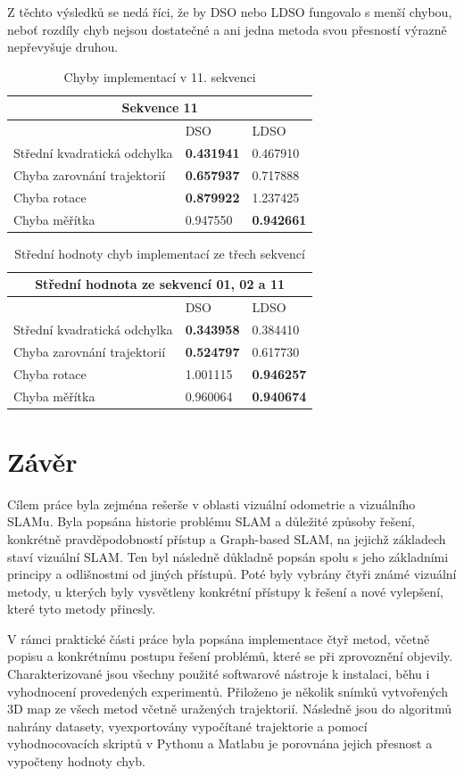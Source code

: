 \documentclass[12pt,a4paper]{article}
\begin{document}
Z těchto výsledků se nedá říci, že by DSO nebo LDSO fungovalo s menší chybou, neboť rozdíly chyb nejsou dostatečné a ani jedna metoda svou přesností výrazně nepřevyšuje druhou.
\begin{table}[H]
\centering
\begin{tabular}{|l|l|l|}
\hline
\multicolumn{3}{|c|}{\textbf{Sekvence 11}} \\
\hline
 & DSO & LDSO \\
\hline
Střední kvadratická odchylka & \textbf{0.431941} & 0.467910 \\
Chyba zarovnání trajektorií & \textbf{0.657937} & 0.717888 \\
Chyba rotace & \textbf{0.879922} & 1.237425 \\
Chyba měřítka & 0.947550 & \textbf{0.942661} \\
\hline
\end{tabular}
\caption{Chyby implementací v 11. sekvenci}
\end{table}


\noindent
\begin{table}[H]
\centering
\begin{tabular}{|l|l|l|}
\hline
\multicolumn{3}{|c|}{\textbf{Střední hodnota ze sekvencí 01, 02 a 11}} \\
\hline
 & DSO & LDSO \\
\hline
Střední kvadratická odchylka & \textbf{0.343958} & 0.384410 \\
Chyba zarovnání trajektorií & \textbf{0.524797} & 0.617730 \\
Chyba rotace & 1.001115 & \textbf{0.946257} \\
Chyba měřítka & 0.960064 & \textbf{0.940674} \\
\hline
\end{tabular}
\caption{Střední hodnoty chyb implementací ze třech sekvencí}
\end{table}


\section{Závěr}
Cílem práce byla zejména rešerše v oblasti vizuální odometrie a vizuálního SLAMu. Byla popsána historie problému SLAM a důležité způsoby řešení, konkrétně pravděpodobností přístup a Graph-based SLAM, na jejichž základech staví vizuální SLAM. Ten byl následně důkladně popsán spolu s jeho základními principy a odlišnostmi od jiných přístupů. Poté byly vybrány čtyři známé vizuální metody, u kterých byly vysvětleny konkrétní přístupy k řešení a nové vylepšení, které tyto metody přinesly.

V rámci praktické části práce byla popsána implementace čtyř metod, včetně popisu a konkrétnímu postupu řešení problémů, které se při zprovoznění objevily. Charakterizované jsou všechny použité softwarové nástroje k instalaci, běhu i vyhodnocení provedených experimentů. Přiloženo je několik snímků vytvořených 3D map ze všech metod včetně uražených trajektorií. Následně jsou do algoritmů nahrány datasety, vyexportovány vypočítané trajektorie a pomocí vyhodnocovacích skriptů v Pythonu a Matlabu je porovnána jejich přesnost a vypočteny hodnoty chyb.


\newpage

\end{document}
